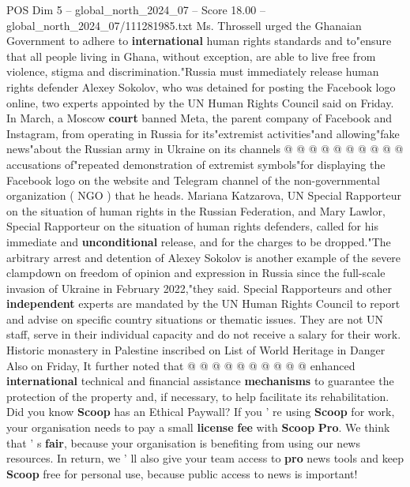 \begin{textsample}{POS Dim 5 – global\_north\_2024\_07 – Score 18.00 – global\_north\_2024\_07/111281985.txt}
Ms.
Throssell urged the Ghanaian Government to adhere to \textbf{international} human rights standards and to"ensure that all people living in Ghana, without exception, are able to live free from violence, stigma and discrimination."Russia must immediately release human rights defender Alexey Sokolov, who was detained for posting the Facebook logo online, two experts appointed by the UN Human Rights Council said on Friday.
In March, a Moscow \textbf{court} banned Meta, the parent company of Facebook and Instagram, from operating in Russia for its"extremist activities"and allowing"fake news"about the Russian army in Ukraine on its channels @ @ @ @ @ @ @ @ @ @ accusations of"repeated demonstration of extremist symbols"for displaying the Facebook logo on the website and Telegram channel of the non-governmental organization ( NGO ) that he heads.
Mariana Katzarova, UN Special Rapporteur on the situation of human rights in the Russian Federation, and Mary Lawlor, Special Rapporteur on the situation of human rights defenders, called for his immediate and \textbf{unconditional} release, and for the charges to be dropped."The arbitrary arrest and detention of Alexey Sokolov is another example of the severe clampdown on freedom of opinion and expression in Russia since the full-scale invasion of Ukraine in February 2022,"they said.
Special Rapporteurs and other \textbf{independent} experts are mandated by the UN Human Rights Council to report and advise on specific country situations or thematic issues.
They are not UN staff, serve in their individual capacity and do not receive a salary for their work.
Historic monastery in Palestine inscribed on List of World Heritage in Danger Also on Friday, It further noted that @ @ @ @ @ @ @ @ @ @ enhanced \textbf{international} technical and financial assistance \textbf{mechanisms} to guarantee the protection of the property and, if necessary, to help facilitate its rehabilitation.
Did you know \textbf{Scoop} has an Ethical Paywall?
If you ' re using \textbf{Scoop} for work, your organisation needs to pay a small \textbf{license} \textbf{fee} with \textbf{Scoop} \textbf{Pro}.
We think that ' s \textbf{fair}, because your organisation is benefiting from using our news resources.
In return, we ' ll also give your team access to \textbf{pro} news tools and keep \textbf{Scoop} free for personal use, because public access to news is important!

\end{textsample}
